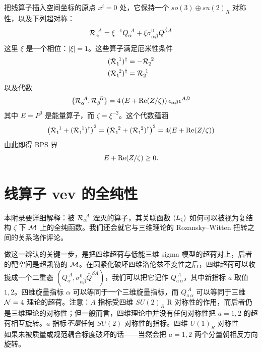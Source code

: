 把线算子插入空间坐标的原点 $x^i =0$ 处，它保持一个 $so(3) \oplus su(2)_R$ 对称性，以及下列超对称：
%
\begin{equation}
\mathcal{R}_{\alpha}^{~A} = \xi^{-1} Q_{\alpha}^{~A} + \xi
\sigma^0_{\alpha\dot\beta} \bar Q^{\dot \beta A}
\end{equation}
%
这里 $\xi$ 是一个相位：$\vert \xi \vert =1$。这些算子满足厄米性条件
%
\begin{equation}
\begin{split}
(\mathcal{R}_{1}^{~1})^\dagger & = - \mathcal{R}_{2}^{~2} \\
(\mathcal{R}_{1}^{~2})^\dagger & =   \mathcal{R}_{2}^{~1} \\
\end{split}
\end{equation}
%
以及代数
%
\begin{equation}
\{ \mathcal{R}_{\alpha}^{~A} , \mathcal{R}_{\beta}^{~B} \} = 4 \left( E + \operatorname{Re}(Z/\zeta) \right) \epsilon_{\alpha\beta} \epsilon^{AB}
\end{equation}
%
其中 $E=P^0$ 是能量算子，而 $\zeta = \xi^{-2}$。这个代数蕴涵
%
\begin{equation}
\left( \mathcal{R}_{1}^{~1} + (\mathcal{R}_{1}^{~1})^\dagger \right)^2 = \left(
\mathcal{R}_{1}^{~2} + (\mathcal{R}_{1}^{~2})^\dagger \right)^2 =  4 (E + \operatorname{Re}(Z/\zeta) )
\end{equation}
%
由此即得 BPS 界
%
\begin{equation}
E + \operatorname{Re}(Z/\zeta) \geq 0.
\end{equation}

\section{线算子 vev 的全纯性}
\label{app:Holomorphy}

本附录要详细解释：被 $\mathcal{R}_{\alpha}^{~A}$ 湮灭的算子，其关联函数 $\langle L_\zeta  \rangle$ 如何可以被视为复结构 $\zeta$ 下 $\mathcal{M}$ 上的全纯函数。我们还会就它与三维理论的 Rozansky--Witten 扭转之间的关系略作评论。

做这一辨认的关键一步，是把四维超荷与低能三维 sigma 模型的超荷对上，后者的靶空间是超凯勒的 $\mathcal{M}$。在圆紧化破坏四维洛伦兹不变性之后，四维超荷可以收拢成一个二重态 $\left(Q_{\alpha}^{~A}, \sigma^0_{\alpha\dot\beta} \bar Q^{\dot \beta A}\right)$，我们可以把它记作 $Q^{~A}_{a~\alpha}$，其中新指标 $a$ 取值 $1,2$。四维旋量指标 $\alpha$ 可以等同于一个三维旋量指标，而 $Q^{~A}_{a~\alpha}$ 可以等同于三维 ${\cal N}=4$ 理论的超荷。注意：$A$ 指标受四维 $SU(2)_R$ R 对称性的作用，而后者仍是三维理论的对称性；但一般而言，四维理论中并没有任何对称性把 $a=1,2$ 的超荷相互旋转。$a$ 指标\emph{不是}任何 $SU(2)$ 对称性的指标。四维 $U(1)_R$ 对称性——如果未被质量或规范耦合标度破坏的话——当然会把 $a=1,2$ 两个分量朝相反方向旋转。

